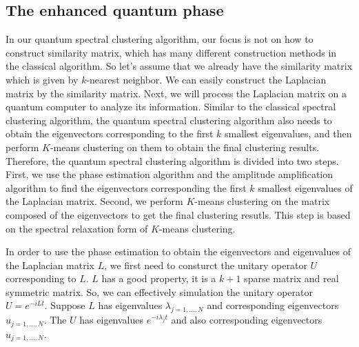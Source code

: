\documentclass[onecolumn,notitlepage]{revtex4-1}
\begin{document}
\subsection{The enhanced quantum phase}
In our quantum spectral clustering algorithm, our focus is not on how to construct similarity matrix, which has many different construction methods in the classical algorithm. 
So let's assume that we already have the similarity matrix which is given by $k$-nearest neighbor. 
We can easily construct the Laplacian matrix by the similarity matrix. 
Next, we will process the Laplacian matrix on a quantum computer to analyze its information. 
Similar to the classical spectral clustering algorithm, the quantum spectral clustering algorithm also needs to obtain the eigenvectors corresponding to the first $k$ smallest eigenvalues, and then perform $K$-means clustering on them to obtain the final clustering results. 
Therefore, the quantum spectral clustering algorithm is divided into two steps. 
First, we use the phase estimation algorithm and the amplitude amplification algorithm to find the eigenvectors corresponding the first $k$ smallest eigenvalues of the Laplacian matrix. 
Second, we perform $K$-means clustering on the matrix composed of the eigenvectors to get the final clustering resutls. 
This step is based on the spectral relaxation form of $K$-means clustering.

In order to use the phase estimation to obtain the eigenvectors and eigenvalues of the Laplacian matrix $L$, we first need to consturct the unitary operator $U$ corresponding to $L$. 
$L$ has a good property, it is a $k+1$ sparse matrix and real symmetric matrix. 
So, we can effectively simulation the unitary operator $U=e^{-iLt}$. Suppose $L$ has eigenvalues $\lambda_{j=1,...,N}$ and corresponding eigenvectors $u_{j=1,...,N}$. 
The $U$ has eigenvalues $e^{-i\lambda_{j}t}$ and also corresponding eigenvectors $u_{j=1,...,N}$.
\end{document}
